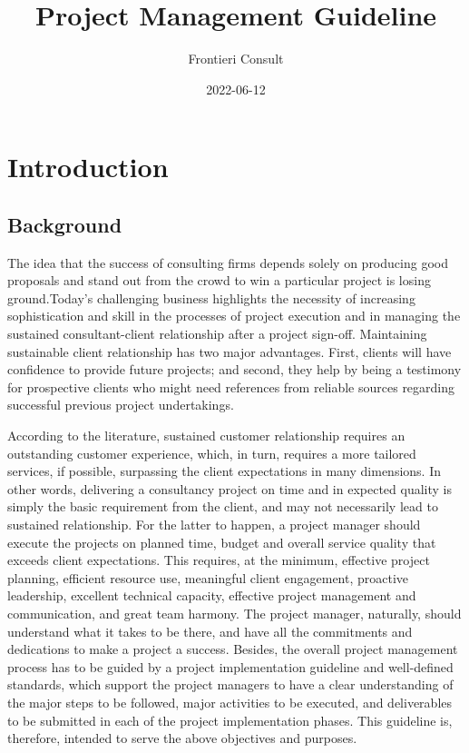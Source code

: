 \documentclass[
]{book}
\title{Project Management Guideline}
\author{Frontieri Consult}
\date{2022-06-12}
\theoremstyle{definition}
\theoremstyle{definition}
\theoremstyle{definition}
\theoremstyle{definition}
\theoremstyle{remark}
\begin{document}
\maketitle

{
\setcounter{tocdepth}{1}
\tableofcontents
}
\hypertarget{introduction}{%
\chapter{Introduction}\label{introduction}}

\hypertarget{background}{%
\section{Background}\label{background}}

The idea that the success of consulting firms depends solely on producing good proposals and stand out from the crowd to win a particular project is losing ground.Today's challenging business highlights the necessity of increasing sophistication and skill in the processes of project execution and in managing the sustained consultant-client relationship after a project sign-off. Maintaining sustainable client relationship has two major advantages. First, clients will have confidence to provide future projects; and second, they help by being a testimony for prospective clients who might need references from reliable sources regarding successful previous project undertakings.

According to the literature, sustained customer relationship requires an outstanding customer experience, which, in turn, requires a more tailored services, if possible, surpassing the client expectations in many dimensions. In other words, delivering a consultancy project on time and in expected quality is simply the basic requirement from the client, and may not necessarily lead to sustained relationship. For the latter to happen, a project manager should execute the projects on planned time, budget and overall service quality that exceeds client expectations. This requires, at the minimum, effective project planning, efficient resource use, meaningful client engagement, proactive leadership, excellent technical capacity, effective project management and communication, and great team harmony. The project manager, naturally, should understand what it takes to be there, and have all the commitments and dedications to make a project a success. Besides, the overall project management process has to be guided by a project implementation guideline and well-defined standards, which support the project managers to have a clear understanding of the major steps to be followed, major activities to be executed, and deliverables to be submitted in each of the project implementation phases. This guideline is, therefore, intended to serve the above objectives and purposes.
\end{document}
